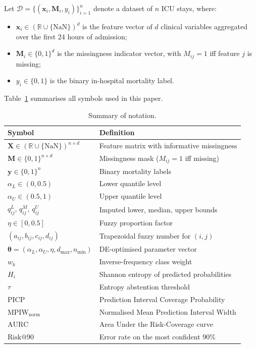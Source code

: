 \documentclass[a4paper,fleqn,longmktitle]{cas-sc}
\begin{document}
	Let $\mathcal{D} = \{(\mathbf{x}_i, \mathbf{M}_i, y_i)\}_{i=1}^{n}$
	denote a dataset of $n$ ICU stays, where:
	\begin{itemize}[noitemsep]
		\item $\mathbf{x}_i \in (\mathbb{R} \cup \{\text{NaN}\})^d$
		is the feature vector of $d$ clinical variables
		aggregated over the first 24 hours of admission;
		\item $\mathbf{M}_i \in \{0,1\}^d$ is the missingness indicator
		vector, with $M_{ij} = 1$ iff feature $j$ is missing;
		\item $y_i \in \{0, 1\}$ is the binary in-hospital mortality label.
	\end{itemize}
	
	Table~\ref{tab:notation} summarises all symbols used in this paper.
	
	\begin{table}[ht]
		\centering
		\caption{Summary of notation.}
		\label{tab:notation}
		\small
		\begin{tabular}{ll}
			\toprule
			\textbf{Symbol} & \textbf{Definition} \\
			\midrule
			$\mathbf{X} \in (\mathbb{R} \cup \{\text{NaN}\})^{n \times d}$
			& Feature matrix with informative missingness \\
			$\mathbf{M} \in \{0,1\}^{n \times d}$
			& Missingness mask ($M_{ij}=1$ iff missing) \\
			$\mathbf{y} \in \{0,1\}^n$
			& Binary mortality labels \\
			$\alpha_L \in (0, 0.5)$
			& Lower quantile level \\
			$\alpha_U \in (0.5, 1)$
			& Upper quantile level \\
			$q^L_{ij},\, q^M_{ij},\, q^U_{ij}$
			& Imputed lower, median, upper bounds \\
			$\eta \in [0, 0.5]$
			& Fuzzy proportion factor \\
			$(a_{ij}, b_{ij}, c_{ij}, d_{ij})$
			& Trapezoidal fuzzy number for $(i,j)$ \\
			$\boldsymbol{\theta} = (\alpha_L, \alpha_U, \eta, d_{\max}, n_{\min})$
			& DE-optimised parameter vector \\
			$w_k$
			& Inverse-frequency class weight \\
			$H_i$
			& Shannon entropy of predicted probabilities \\
			$\tau$
			& Entropy abstention threshold \\
			$\text{PICP}$
			& Prediction Interval Coverage Probability \\
			$\text{MPIW}_{\text{norm}}$
			& Normalised Mean Prediction Interval Width \\
			$\text{AURC}$
			& Area Under the Risk-Coverage curve \\
			$\text{Risk@90}$
			& Error rate on the most confident 90\% \\
			\bottomrule
		\end{tabular}
	\end{table}
	
\end{document}
